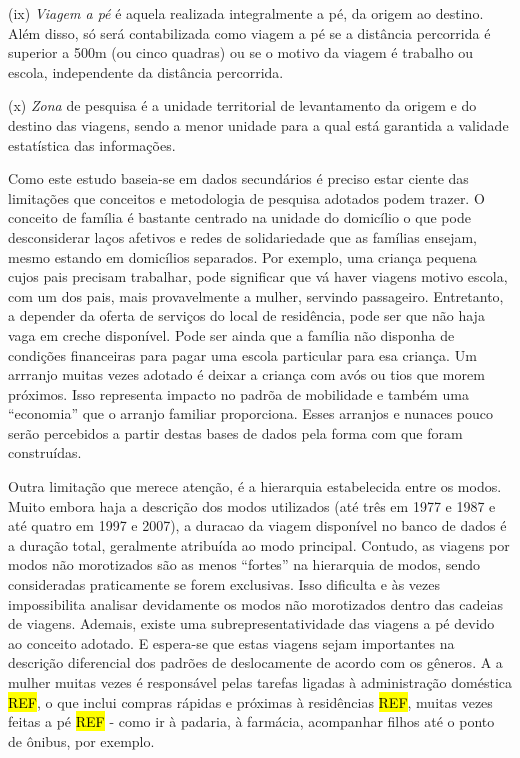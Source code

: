 \begin{compactitem}[]
\item (ix) \emph{Viagem a pé} é aquela realizada integralmente a pé, da origem ao destino. Além disso, só será contabilizada como viagem a pé se a distância percorrida é superior a 500m (ou cinco quadras) ou se o motivo da viagem é trabalho ou escola, independente da distância percorrida.

\item (x) \emph{Zona} de pesquisa é a unidade territorial de levantamento da origem e do destino das viagens, sendo a menor unidade para a qual está garantida a validade estatística das informações.
\end{compactitem}


Como este estudo baseia-se em dados secundários é preciso estar ciente das limitações que conceitos e metodologia de pesquisa adotados podem trazer. O conceito de família é bastante centrado na unidade do domicílio o que pode desconsiderar laços afetivos e redes de solidariedade que as famílias ensejam, mesmo estando em domicílios separados. Por exemplo, uma criança pequena cujos pais precisam trabalhar, pode significar que vá haver viagens motivo escola, com um dos pais, mais provavelmente a mulher, servindo passageiro. Entretanto, a depender da oferta de serviços do local de residência, pode ser que não haja vaga em creche disponível. Pode ser ainda que a família não disponha de  condições financeiras para pagar uma escola particular para esa criança. Um arrranjo muitas vezes adotado é deixar a criança com avós ou tios que morem próximos. Isso representa impacto no padrõa de mobilidade e também uma ``economia'' que o arranjo familiar proporciona. Esses arranjos e nunaces pouco serão percebidos a partir destas bases de dados pela forma com que foram construídas.

Outra limitação que merece atenção, é a hierarquia estabelecida entre os modos. Muito embora haja a descrição dos modos utilizados (até três em 1977 e 1987 e até quatro em 1997 e 2007), a duracao da viagem disponível no banco de dados é a duração total, geralmente atribuída ao modo principal. Contudo, as viagens por modos não morotizados são as menos ``fortes'' na hierarquia de modos, sendo consideradas praticamente se forem exclusivas. Isso dificulta e às vezes impossibilita analisar devidamente os modos não morotizados dentro das cadeias de viagens. 
Ademais, existe uma subrepresentatividade das viagens a pé devido ao conceito adotado. E espera-se que estas viagens sejam importantes na descrição diferencial dos padrões de deslocamente de acordo com os gêneros.  A a mulher muitas vezes é responsável pelas tarefas ligadas à administração doméstica \hl{REF}, o que inclui compras rápidas e próximas à residências \hl{REF}, muitas vezes feitas a pé \hl{REF} - como ir à padaria, à farmácia, acompanhar filhos até o ponto de ônibus, por exemplo.


